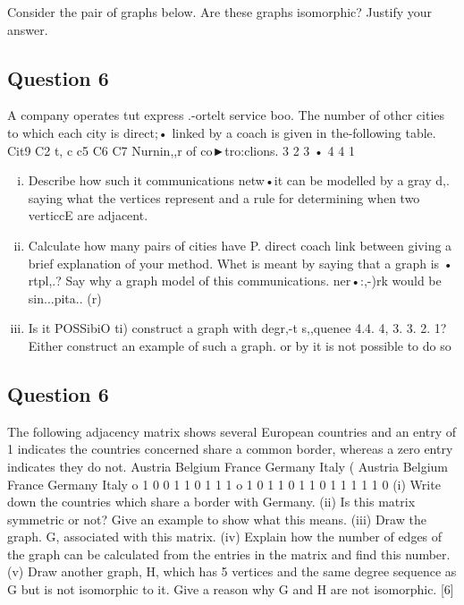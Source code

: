 
\item  Consider the pair of graphs below. Are these graphs isomorphic? Justify your answer.


\subsection{Question 6} A company operates tut express .-ortelt service boo.%
The number of othcr cities to which each city is direct;• linked by a coach is given in the-following table. 
Cit9 
C2 t, c c5 C6 C7 
Nurnin,,r of co►tro:clions. 3 2 3 • 
4 
4 
1 
\begin{enumerate}[(i)]
\item Describe how such it communications netw•it can be modelled by a gray d,. saying what the vertices represent and a rule for determining when two verticcE are adjacent. 
\item  Calculate how many pairs of cities have P. direct coach link between giving a brief explanation of your method. Whet is meant by saying that a graph is • rtpl,.? Say why a graph model of this communications. ner•:,-)rk would be sin...pita.. 
(r) 
\item  Is it POSSibiO ti) construct a graph with degr,-t s,,quenee 4.4. 4, 3. 3. 2. 1? Either construct an example of such a graph. or by it is not possible to do so 
\end{enumerate}
\subsection{Question 6}
 The following adjacency matrix shows several European countries and an entry of 1 indicates the countries concerned share a common border, whereas a zero entry indicates they do not. 
Austria Belgium France Germany Italy 
( 
Austria Belgium France Germany Italy o 1 0 0 1 1 0 1 1 1 o 1 0 1 1 0 1 1 0 1 1 1 1 1 0 
(i) Write down the countries which share a border with Germany. (ii) Is this matrix symmetric or not? Give an example to show what this means. (iii) Draw the graph. G, associated with this matrix. (iv) Explain how the number of edges of the graph can be calculated from the entries in the matrix and find this number. (v) Draw another graph, H, which has 5 vertices and the same degree sequence as G but is not isomorphic to it. Give a reason why G and H are not isomorphic. [6] 



